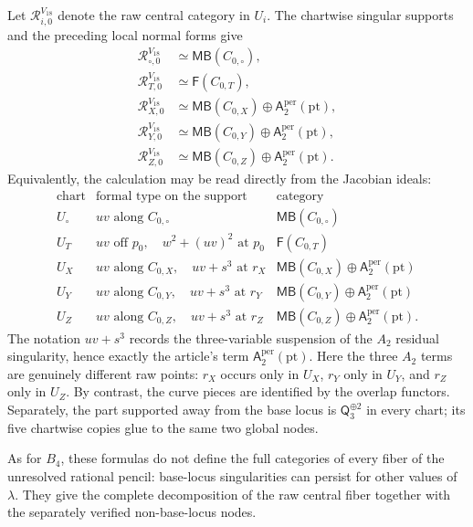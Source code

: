 \documentclass[11pt]{amsart}
\theoremstyle{definition}
\theoremstyle{remark}
\newcommand{\MorseCat}[1]{\mathsf{Q}_{#1}}
\newcommand{\MBcat}[1]{\mathsf{MB}(#1)}
\newcommand{\Aper}[2]{\mathsf{A}^{\mathrm{per}}_{#2}(#1)}
\newcommand{\FormalCat}[1]{\mathsf{F}(#1)}
\begin{document}
Let $\mathcal R^{V_{18}}_{i,0}$ denote the raw central category in $U_i$.
The chartwise singular supports and the preceding local normal forms give
\begin{align}
\mathcal R^{V_{18}}_{\circ,0}
&\simeq \MBcat{C_{0,\circ}},
\label{eq:V18_chart_decomposition_torus}\\
\mathcal R^{V_{18}}_{T,0}
&\simeq \FormalCat{C_{0,T}},\\
\mathcal R^{V_{18}}_{X,0}
&\simeq
\MBcat{C_{0,X}}
\oplus\Aper{\mathrm{pt}}{2},\\
\mathcal R^{V_{18}}_{Y,0}
&\simeq
\MBcat{C_{0,Y}}
\oplus\Aper{\mathrm{pt}}{2},\\
\mathcal R^{V_{18}}_{Z,0}
&\simeq
\MBcat{C_{0,Z}}
\oplus\Aper{\mathrm{pt}}{2}.
\label{eq:V18_chart_decomposition_Z}
\end{align}
Equivalently, the calculation may be read directly from the Jacobian ideals:
\[
\begin{array}{c|c|c}
\text{chart}&\text{formal type on the support}&\text{category}\\ \hline
U_\circ&uv\text{ along }C_{0,\circ}
&\MBcat{C_{0,\circ}}\\
U_T&uv\text{ off }p_0,\quad w^2+(uv)^2\text{ at }p_0
&\FormalCat{C_{0,T}}\\
U_X&uv\text{ along }C_{0,X},\quad uv+s^3\text{ at }r_X
&\MBcat{C_{0,X}}\oplus\Aper{\mathrm{pt}}{2}\\
U_Y&uv\text{ along }C_{0,Y},\quad uv+s^3\text{ at }r_Y
&\MBcat{C_{0,Y}}\oplus\Aper{\mathrm{pt}}{2}\\
U_Z&uv\text{ along }C_{0,Z},\quad uv+s^3\text{ at }r_Z
&\MBcat{C_{0,Z}}\oplus\Aper{\mathrm{pt}}{2}.
\end{array}
\]
The notation $uv+s^3$ records the three-variable suspension of the $A_2$
residual singularity, hence exactly the article's term
$\Aper{\mathrm{pt}}{2}$.
Here the three $A_2$ terms are genuinely different raw points: $r_X$ occurs
only in $U_X$, $r_Y$ only in $U_Y$, and $r_Z$ only in $U_Z$.  By contrast,
the curve pieces are identified by the overlap functors.  Separately, the part
supported away from the base locus is $\MorseCat{3}^{\oplus2}$ in every chart;
its five chartwise copies glue to the same two global nodes.

As for $B_4$, these formulas do not define the full categories of every fiber
of the unresolved rational pencil: base-locus singularities can persist for
other values of $\lambda$.  They give the complete decomposition of the raw
central fiber together with the separately verified non-base-locus nodes.
\end{document}
